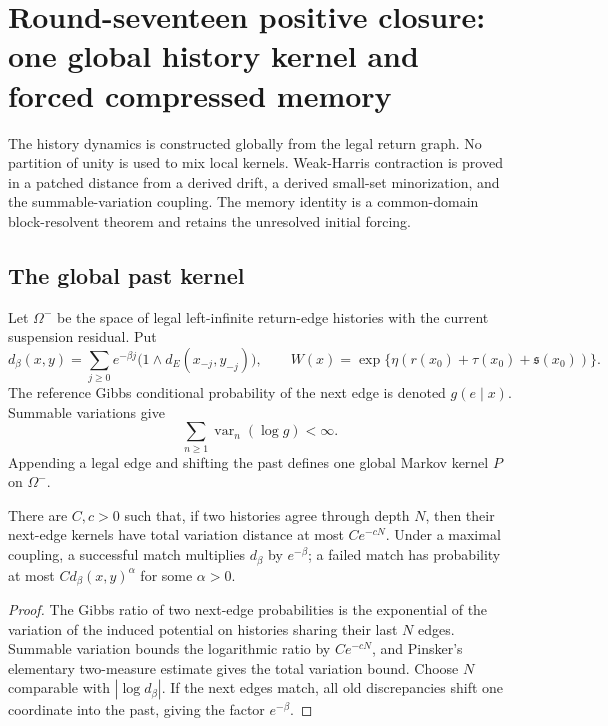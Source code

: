 \section{Round-seventeen positive closure: one global history kernel and forced compressed memory}
\label{sec:r17-a4}

The history dynamics is constructed globally from the legal return graph.  No
partition of unity is used to mix local kernels.  Weak-Harris contraction is
proved in a patched distance from a derived drift, a derived small-set
minorization, and the summable-variation coupling.  The memory identity is a
common-domain block-resolvent theorem and retains the unresolved initial
forcing.

\subsection{The global past kernel}

Let \(\Omega^-\) be the space of legal left-infinite return-edge histories
with the current suspension residual.  Put
\[
 d_\beta(x,y)=\sum_{j\ge0}e^{-\beta j}
   \bigl(1\wedge d_E(x_{-j},y_{-j})\bigr),
 \qquad
 W(x)=\exp\{\eta(r(x_0)+\tau(x_0)+\mathfrak s(x_0))\}.
\]
The reference Gibbs conditional probability of the next edge is denoted
\(g(e\mid x)\).  Summable variations give
\[
 \sum_{n\ge1}\operatorname{var}_n(\log g)<\infty.
\]
Appending a legal edge and shifting the past defines one global Markov kernel
\(P\) on \(\Omega^-\).

\begin{lemma}
\label{lem:r17-a4-coupling}
There are \(C,c>0\) such that, if two histories agree through depth \(N\),
then their next-edge kernels have total variation distance at most
\(Ce^{-cN}\).  Under a maximal coupling, a successful match multiplies
\(d_\beta\) by \(e^{-\beta}\); a failed match has probability at most
\(Cd_\beta(x,y)^\alpha\) for some \(\alpha>0\).
\end{lemma}

\begin{proof}
The Gibbs ratio of two next-edge probabilities is the exponential of the
variation of the induced potential on histories sharing their last \(N\)
edges.  Summable variation bounds the logarithmic ratio by \(Ce^{-cN}\), and
Pinsker's elementary two-measure estimate gives the total variation bound.
Choose \(N\) comparable with \(|\log d_\beta|\).  If the next edges match, all
old discrepancies shift one coordinate into the past, giving the factor
\(e^{-\beta}\).
\end{proof}

